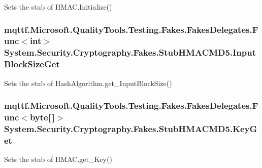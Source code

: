 Sets the stub of H\-M\-A\-C.\-Initialize()

\hypertarget{class_system_1_1_security_1_1_cryptography_1_1_fakes_1_1_stub_h_m_a_c_m_d5_a9a5e7e5b5114cd65c8f6451e7e8fccb2}{
\subsubsection[{Input\-Block\-Size\-Get}]{\setlength{\rightskip}{0pt plus 5cm}mqttf.\-Microsoft.\-Quality\-Tools.\-Testing.\-Fakes.\-Fakes\-Delegates.\-Func$<$int$>$ System.\-Security.\-Cryptography.\-Fakes.\-Stub\-H\-M\-A\-C\-M\-D5.\-Input\-Block\-Size\-Get}}\label{class_system_1_1_security_1_1_cryptography_1_1_fakes_1_1_stub_h_m_a_c_m_d5_a9a5e7e5b5114cd65c8f6451e7e8fccb2}


Sets the stub of Hash\-Algorithm.\-get\-\_\-\-Input\-Block\-Size()

\hypertarget{class_system_1_1_security_1_1_cryptography_1_1_fakes_1_1_stub_h_m_a_c_m_d5_ad9f6f17fe34867c81690069931fb5f2c}{
\subsubsection[{Key\-Get}]{\setlength{\rightskip}{0pt plus 5cm}mqttf.\-Microsoft.\-Quality\-Tools.\-Testing.\-Fakes.\-Fakes\-Delegates.\-Func$<$byte\mbox{[}$\,$\mbox{]}$>$ System.\-Security.\-Cryptography.\-Fakes.\-Stub\-H\-M\-A\-C\-M\-D5.\-Key\-Get}}\label{class_system_1_1_security_1_1_cryptography_1_1_fakes_1_1_stub_h_m_a_c_m_d5_ad9f6f17fe34867c81690069931fb5f2c}


Sets the stub of H\-M\-A\-C.\-get\-\_\-\-Key()

